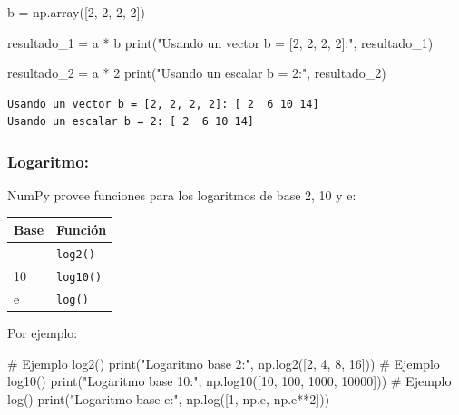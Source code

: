\documentclass[
  letterpaper,
  DIV=11,
  numbers=noendperiod]{scrreprt}
\newenvironment{Shaded}{\begin{snugshade}}{\end{snugshade}}
\newcommand{\BuiltInTok}[1]{\textcolor[rgb]{0.00,0.23,0.31}{#1}}
\newcommand{\CommentTok}[1]{\textcolor[rgb]{0.37,0.37,0.37}{#1}}
\newcommand{\DecValTok}[1]{\textcolor[rgb]{0.68,0.00,0.00}{#1}}
\newcommand{\NormalTok}[1]{\textcolor[rgb]{0.00,0.23,0.31}{#1}}
\newcommand{\OperatorTok}[1]{\textcolor[rgb]{0.37,0.37,0.37}{#1}}
\newcommand{\StringTok}[1]{\textcolor[rgb]{0.13,0.47,0.30}{#1}}
\begin{document}
\begin{Shaded}
\begin{Highlighting}[]
\NormalTok{b }\OperatorTok{=}\NormalTok{ np.array([}\DecValTok{2}\NormalTok{, }\DecValTok{2}\NormalTok{, }\DecValTok{2}\NormalTok{, }\DecValTok{2}\NormalTok{])}

\NormalTok{resultado\_1 }\OperatorTok{=}\NormalTok{ a }\OperatorTok{*}\NormalTok{ b}
\BuiltInTok{print}\NormalTok{(}\StringTok{"Usando un vector b = [2, 2, 2, 2]:"}\NormalTok{, resultado\_1) }

\NormalTok{resultado\_2 }\OperatorTok{=}\NormalTok{ a }\OperatorTok{*} \DecValTok{2}
\BuiltInTok{print}\NormalTok{(}\StringTok{"Usando un escalar b = 2:"}\NormalTok{, resultado\_2) }
\end{Highlighting}
\end{Shaded}

\begin{verbatim}
Usando un vector b = [2, 2, 2, 2]: [ 2  6 10 14]
Usando un escalar b = 2: [ 2  6 10 14]
\end{verbatim}

\subsubsection{Logaritmo:}\label{logaritmo}

NumPy provee funciones para los logaritmos de base 2, 10 y e:

\begin{longtable}[]{@{}ll@{}}
\toprule\noalign{}
Base & Función \\
\midrule\noalign{}
\endhead
\bottomrule\noalign{}
\endlastfoot
2 & \texttt{log2()} \\
10 & \texttt{log10()} \\
e & \texttt{log()} \\
\end{longtable}

Por ejemplo:

\begin{Shaded}
\begin{Highlighting}[]
\CommentTok{\# Ejemplo log2()}
\BuiltInTok{print}\NormalTok{(}\StringTok{"Logaritmo base 2:"}\NormalTok{, np.log2([}\DecValTok{2}\NormalTok{, }\DecValTok{4}\NormalTok{, }\DecValTok{8}\NormalTok{, }\DecValTok{16}\NormalTok{]))}
\CommentTok{\# Ejemplo log10()}
\BuiltInTok{print}\NormalTok{(}\StringTok{"Logaritmo base 10:"}\NormalTok{, np.log10([}\DecValTok{10}\NormalTok{, }\DecValTok{100}\NormalTok{, }\DecValTok{1000}\NormalTok{, }\DecValTok{10000}\NormalTok{]))}
\CommentTok{\# Ejemplo log()}
\BuiltInTok{print}\NormalTok{(}\StringTok{"Logaritmo base e:"}\NormalTok{, np.log([}\DecValTok{1}\NormalTok{, np.e, np.e}\OperatorTok{**}\DecValTok{2}\NormalTok{]))}
\end{Highlighting}
\end{Shaded}
\end{document}
